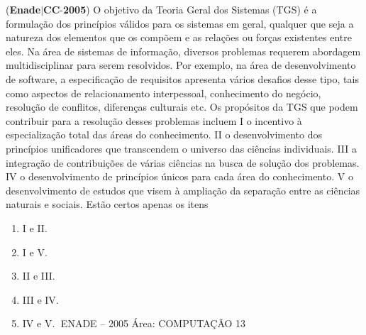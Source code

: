 \documentclass{exam}
\begin{document}
\begin{questions}
\question (\textbf{Enade}$|$\textbf{CC}-\textbf{2005}) O objetivo da Teoria Geral dos Sistemas (TGS) é a formulação
dos princípios válidos para os sistemas em geral, qualquer que
seja a natureza dos elementos que os compõem e as relações ou
forças existentes entre eles. Na área de sistemas de informação,
diversos problemas requerem abordagem multidisciplinar para
serem resolvidos. Por exemplo, na área de desenvolvimento de
software, a especificação de requisitos apresenta vários desafios
desse tipo, tais como aspectos de relacionamento interpessoal,
conhecimento do negócio, resolução de conflitos, diferenças
culturais etc. Os propósitos da TGS que podem contribuir para
a resolução desses problemas incluem
I o incentivo à especialização total das áreas do
conhecimento.
II o desenvolvimento dos princípios unificadores que
transcendem o universo das ciências individuais.
III a integração de contribuições de várias ciências na busca de
solução dos problemas.
IV o desenvolvimento de princípios únicos para cada área do
conhecimento.
V o desenvolvimento de estudos que visem à ampliação da
separação entre as ciências naturais e sociais.
Estão certos apenas os itens
	\begin{enumerate}[label=\alph*)]
		\item  I e II.
		\item  I e V.
		\item  II e III.
		\item  III e IV.
		\item  IV e V.
ENADE – 2005 Área: COMPUTAÇÃO 13

	\end{enumerate}


\end{questions}
\end{document}
